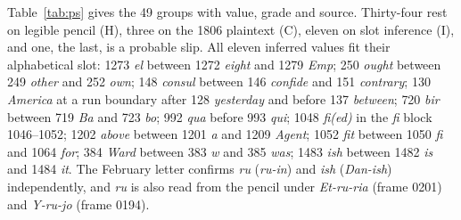 \documentclass[]{interact}
\newcommand{\grp}[1]{\textsf{#1}}
\begin{document}
Table~\ref{tab:ps} gives the 49 groups with value, grade and source. Thirty-four rest on legible pencil (H), three on the 1806 plaintext (C), eleven on slot inference (I), and one, the last, is a probable slip. All eleven inferred values fit their alphabetical slot: \grp{1273} \emph{el} between \grp{1272} \emph{eight} and \grp{1279} \emph{Emp}; \grp{250} \emph{ought} between \grp{249} \emph{other} and \grp{252} \emph{own}; \grp{148} \emph{consul} between \grp{146} \emph{confide} and \grp{151} \emph{contrary}; \grp{130} \emph{America} at a run boundary after \grp{128} \emph{yesterday} and before \grp{137} \emph{between}; \grp{720} \emph{bir} between \grp{719} \emph{Ba} and \grp{723} \emph{bo}; \grp{992} \emph{qua} before \grp{993} \emph{qui}; \grp{1048} \emph{fi(ed)} in the \emph{fi} block 1046--1052; \grp{1202} \emph{above} between \grp{1201} \emph{a} and \grp{1209} \emph{Agent}; \grp{1052} \emph{fit} between \grp{1050} \emph{fi} and \grp{1064} \emph{for}; \grp{384} \emph{Ward} between \grp{383} \emph{w} and \grp{385} \emph{was}; \grp{1483} \emph{ish} between \grp{1482} \emph{is} and \grp{1484} \emph{it}. The February letter confirms \emph{ru} (\emph{ru-in}) and \emph{ish} (\emph{Dan-ish}) independently, and \emph{ru} is also read from the pencil under \emph{Et-ru-ria} (frame 0201) and \emph{Y-ru-jo} (frame 0194).
\end{document}
